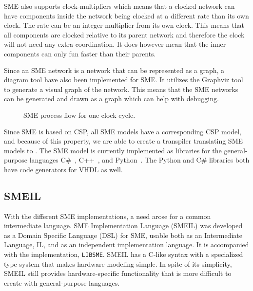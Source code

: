 SME also supports clock-multipliers which means that a clocked network can have components inside the network being clocked at a different rate than its own clock. The rate can be an integer multiplier from its own clock. This means that all components are clocked relative to its parent network and therefore the clock will not need any extra coordination. It does however mean that the inner components can only fun faster than their parents.

Since an SME network is a network that can be represented as a graph, a diagram tool have also been implemented for SME. It utilizes the Graphviz tool to generate a visual graph of the network. This means that the SME networks can be generated and drawn as a graph which can help with debugging.


\begin{figure}[!ht]
  \centering
  \caption{SME process flow for one clock cycle.}
  \label{fig:sme_process_flow}
\end{figure}
Since SME is based on CSP, all SME models have a
corresponding CSP model, and because of this property, we are able to create a transpiler translating SME models to \cspm{}.
The SME model is currently implemented as libraries for the general-purpose languages C\#~\cite{Skovhede}, C++~\cite{asheim2015}, and Python~\cite{asheim2016vhdl}. The Python and C\# libraries both have code generators for VHDL as well.
\newpage
\subsection{SMEIL}
\label{SMEIL-section}
With the different SME implementations, a need arose for a common intermediate language. SME Implementation Language (SMEIL) was developed as a Domain Specific Language (DSL) for SME, usable both as an Intermediate Language, IL, and as an independent implementation language. It is accompanied with the implementation, \texttt{LIBSME}. %
SMEIL has a C-like syntax with a specialized type system that makes hardware modeling simple. In spite of its simplicity, SMEIL still provides hardware-specific functionality that is more difficult to create with general-purpose languages.

